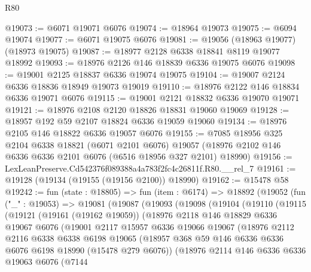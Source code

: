 \begin{lexlean}{R80}
\begin{coremodule}
@19073 := @6071 @19071 @6076
@19074 := @18964 @19073
@19075 := @6094 @19074
@19077 := @6071 @19075 @6076
@19081 := @19056 (@18963 @19077) (@18973 @19075)
@19087 := @18977 @2128 @6338 @18841 @8119 @19077 @18992
@19093 := @18976 @2126 @146 @18839 @6336 @19075 @6076
@19098 := @19001 @2125 @18837 @6336 @19074 @19075
@19104 := @19007 @2124 @6336 @18836 @18949 @19073 @19019
@19110 := @18976 @2122 @146 @18834 @6336 @19071 @6076
@19115 := @19001 @2121 @18832 @6336 @19070 @19071
@19121 := @18976 @2108 @2120 @18826 @18831 @19060 @19069
@19128 := @18957 @192 @59 @2107 @18824 @6336 @19059 @19060
@19134 := @18976 @2105 @146 @18822 @6336 @19057 @6076
@19155 := @7085
    @18956
    @325
    @2104
    @6338
    @18821
    (@6071 @2101 @6076)
    @19057
    (@18976 @2102 @146 @6336 @6336 @2101 @6076 (@6516 @18956 @327 @2101) @18990)
@19156 := LexLeanPreserve.Cd542376f089388a4a783f2fc4c26811f.R80.__rel_7
@19161 := @19128 (@19134 (@19155 (@19156 @2100)) @18990)
@19162 := @15478 @58
@19242 := fun (state : @18805) =>
  fun (item : @6174) =>
  @18892
    (@19052
      (fun ("_" : @19053) =>
      @19081
        (@19087
          (@19093
            (@19098
              (@19104
                (@19110
                  (@19115
                    (@19121
                      (@19161 (@19162 @19059))
                      (@18976
                        @2118
                        @146
                        @18829
                        @6336
                        @19067
                        @6076
                        (@19001
                          @2117
                          @15957
                          @6336
                          @19066
                          @19067
                          (@18976
                            @2112
                            @2116
                            @6338
                            @6338
                            @6198
                            @19065
                            (@18957
                              @368
                              @59
                              @146
                              @6336
                              @6336
                              @6076
                              @6198
                              @18990
                              (@15478 @279 @6076))
                            (@18976
                              @2114
                              @146
                              @6336
                              @6336
                              @19063
                              @6076
                              (@7144

\end{coremodule}
\end{lexlean}
